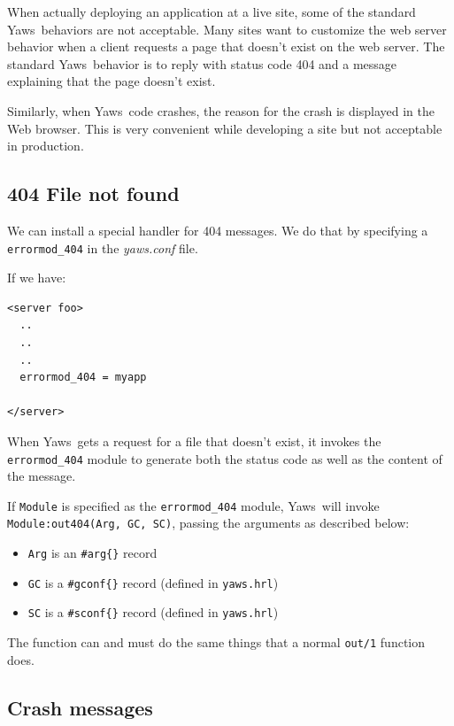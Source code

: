 \documentclass[11pt,oneside,english]{book}
\newcommand{\Yaws}            %
        {{\sc Yaws}}
\begin{document}
When actually deploying an application at a live site, some of the
standard \Yaws\ behaviors are not acceptable. Many sites want to
customize the web server behavior when a client requests a page that
doesn't exist on the web server. The standard \Yaws\ behavior is to
reply with status code 404 and a message explaining that the page
doesn't exist.

Similarly, when \Yaws\  code crashes, the reason for the crash is
displayed in the Web browser. This is very convenient while
developing a site but not acceptable in production.


\subsection{404 File not found}

We can install a special handler for 404 messages. We do that by
specifying a \verb+errormod_404+ in the \textit{yaws.conf} file.

If we have:

\begin{verbatim}
<server foo>
  ..
  ..
  ..
  errormod_404 = myapp

</server>

\end{verbatim}

When \Yaws\ gets a request for a file that doesn't exist, it invokes
the \verb+errormod_404+ module to generate both the status code as
well as the content of the message.

If \verb+Module+ is specified as the \verb+errormod_404+ module,
\Yaws\ will invoke \verb+Module:out404(Arg, GC, SC)+, passing the
arguments as described below:

\begin{itemize}
\item \verb+Arg+ is an \verb+#arg{}+ record

\item \verb+GC+ is a \verb+#gconf{}+ record (defined in \verb+yaws.hrl+)

\item \verb+SC+ is a \verb+#sconf{}+ record (defined in
  \verb+yaws.hrl+)
\end{itemize}

The function can and must do the same things that a normal
\verb+out/1+ function does.


\subsection{Crash messages}
\end{document}
